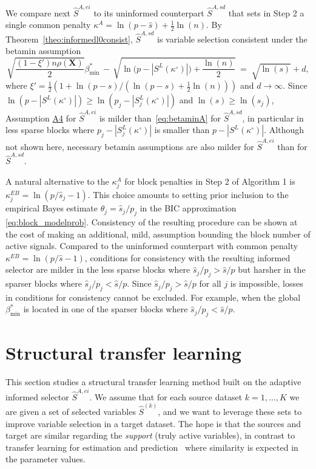 \documentclass[
  12pt]{article}
\newcommand{\bX}{\mathbf{X}}
\begin{document}
We compare next $\hat{S}^{A,ei}$ to its uninformed counterpart $\hat{S}^{A,sd}$ that sets in Step 2 a single common penalty $\kappa^{A}=\ln(p-\hat{s})+ \tfrac{1}{2}\ln(n)$. By Theorem~\ref{theo:informedl0consist}, $\hat{S}^{A,sd}$ is variable selection consistent under the betamin assumption
\begin{equation}\label{eq:betaminA}
        \sqrt{\frac{ (1-\xi')n\rho(\bX)}{2}}\beta_{\min}^* \,- \,\sqrt{\ln\big(p-|S^{L}(\kappa^{\circ})|\big)+\frac{\ln(n)}{2}} \;=\; \sqrt{\ln(s)} +  d,
    \end{equation}
where $\xi'=\tfrac12(1+\ln(p-s)/(\ln(p-s)+\tfrac12 \ln(n)))$ and $d\to \infty$. 
Since
$\ln(p-|S^{L}(\kappa^{\circ})|)\geq \ln(p_j-|S_j^{L}(\kappa^{\circ})|)$ and $\ln(s)\geq \ln(s_j)$, Assumption \hyperlink{lab:A4}{A4} for $\hat S^{A,ei}$ is milder than~\eqref{eq:betaminA} for $\hat S^{A,sd}$, in particular in less sparse blocks where $p_j-|S_j^{L}(\kappa^{\circ})|$ is smaller than $p-|S^{L}(\kappa^{\circ})|$. Although not shown here, necessary betamin assumptions are also milder for $\hat S^{A,ei}$ than for $\hat S^{A,sd}$.

\color{green}A natural alternative to the $\kappa^{A}_j$ for block penalties in Step 2 of Algorithm 1 is $\kappa^{EB}_j=\ln(p/\hat{s}_j-1)$. This choice amounts to setting prior inclusion to the empirical Bayes estimate $\theta_j=\hat{s}_j/p_j$ in the BIC approximation \eqref{eq:block_modelprob}. Consistency of the resulting procedure can be shown at the cost of making an additional, mild, assumption bounding the block number of active signals. Compared to the uninformed counterpart with common penalty  $\kappa^{EB}=\ln(p/\hat{s}-1)$, conditions for consistency with the resulting informed selector are milder in the less sparse blocks where $\hat s_j/p_j>\hat s/p$ but harsher in the sparser blocks where $\hat s_j/p_j<\hat s/p$. Since $\hat s_j/ p_j>\hat s/p$ for all $j$ is impossible, losses in conditions for consistency cannot be excluded. For example, when the global $\beta_{\min}^*$ is located in one of the sparser blocks where $\hat s_j/p_j<\hat s/p$.\color{black}

\section{Structural transfer learning}\label{sec:TL}

This section studies a structural transfer learning method built on the adaptive informed selector $\hat S^{A,ei}$.
We assume that for each source dataset $k=1,\ldots,K$ we are given a set of selected variables $\hat{S}^{(k)}$, and we want to leverage these sets to improve variable selection in a target dataset.
The hope is that the sources and target are similar regarding the \emph{support} (truly active variables),
in contrast to transfer learning for estimation and prediction~\citep{Li2021,Tian2023,abba2024} where similarity is expected in the parameter values.
\end{document}

